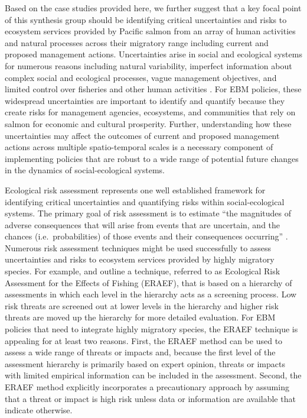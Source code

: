 Based on the case studies provided here, we further suggest that a key focal
point of this synthesis group should be identifying critical uncertainties and
risks to ecosystem services provided by Pacific salmon from an array of human
activities and natural processes across their migratory range including current
and proposed management actions. Uncertainties arise in social and ecological
systems for numerous reasons including natural variability, imperfect
information about complex social and ecological processes, vague management
objectives, and limited control over fisheries and other human activities
\citep{Peterman2004a}. For EBM policies, these widespread uncertainties are
important to identify and quantify because they create risks for management
agencies, ecosystems, and communities that rely on salmon for economic and
cultural prosperity. Further, understanding how these uncertainties may affect
the outcomes of current and proposed management actions across multiple
spatio-temporal scales is a necessary component of implementing policies that
are robust to a wide range of potential future changes in the dynamics of
social-ecological systems.

Ecological risk assessment represents one well established framework for
identifying critical uncertainties and quantifying risks within
social-ecological systems. The primary goal of risk assessment is to estimate
``the magnitudes of adverse consequences that will arise from events that are
uncertain, and the chances (i.e.~probabilities) of those events and their
consequences occurring'' \citep{Peterman2004a}. Numerous risk assessment
techniques might be used successfully to assess uncertainties and risks to
ecosystem services provided by highly migratory species. For example,
\citet{Smith2007} and \citet{Hobday2011} outline a technique,
referred to as Ecological Risk Assessment for the Effects of Fishing (ERAEF),
that is based on a hierarchy of assessments in which each level in the hierarchy
acts as a screening process. Low risk threats are screened out at lower levels
in the hierarchy and higher risk threats are moved up the hierarchy for more
detailed evaluation. For EBM policies that need to integrate highly migratory
species, the ERAEF technique is appealing for at least two reasons. First, the
ERAEF method can be used to assess a wide range of threats or impacts and,
because the first level of the assessment hierarchy is primarily based on expert
opinion, threats or impacts with limited empirical information can be included
in the assessment. Second, the ERAEF method explicitly incorporates a
precautionary approach by assuming that a threat or impact is high risk unless
data or information are available that indicate otherwise.

